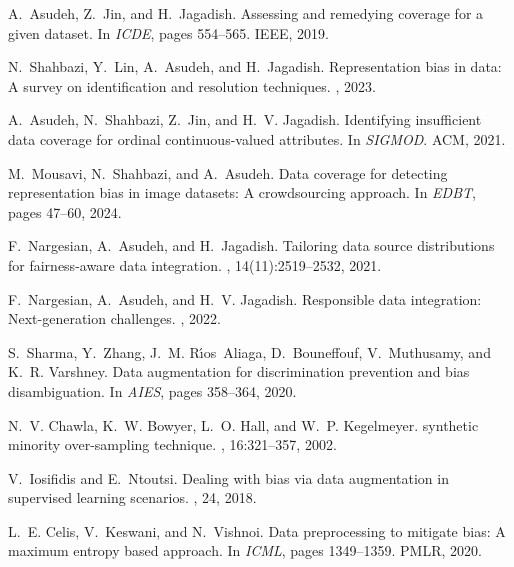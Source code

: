 \documentclass[11pt]{article}
\begin{document}

\small
% 
\begin{thebibliography}{10}

A.~Asudeh, Z.~Jin, and H.~Jagadish.
\newblock Assessing and remedying coverage for a given dataset.
\newblock In {\em ICDE}, pages 554--565. IEEE, 2019.

N.~Shahbazi, Y.~Lin, A.~Asudeh, and H.~Jagadish.
\newblock Representation bias in data: A survey on identification and resolution techniques.
, 2023.

A.~Asudeh, N.~Shahbazi, Z.~Jin, and H.~V. Jagadish.
\newblock Identifying insufficient data coverage for ordinal continuous-valued attributes.
\newblock In {\em SIGMOD}. ACM, 2021.

M.~Mousavi, N.~Shahbazi, and A.~Asudeh.
\newblock Data coverage for detecting representation bias in image datasets: {A} crowdsourcing approach.
\newblock In {\em {EDBT}}, pages 47--60, 2024.

F.~Nargesian, A.~Asudeh, and H.~Jagadish.
\newblock Tailoring data source distributions for fairness-aware data integration.
, 14(11):2519--2532, 2021.

F.~Nargesian, A.~Asudeh, and H.~V. Jagadish.
\newblock Responsible data integration: Next-generation challenges.
, 2022.

S.~Sharma, Y.~Zhang, J.~M. R{\'\i}os~Aliaga, D.~Bouneffouf, V.~Muthusamy, and K.~R. Varshney.
\newblock Data augmentation for discrimination prevention and bias disambiguation.
\newblock In {\em AIES}, pages 358--364, 2020.

N.~V. Chawla, K.~W. Bowyer, L.~O. Hall, and W.~P. Kegelmeyer.
 synthetic minority over-sampling technique.
, 16:321--357, 2002.

V.~Iosifidis and E.~Ntoutsi.
\newblock Dealing with bias via data augmentation in supervised learning scenarios.
, 24, 2018.

L.~E. Celis, V.~Keswani, and N.~Vishnoi.
\newblock Data preprocessing to mitigate bias: A maximum entropy based approach.
\newblock In {\em ICML}, pages 1349--1359. PMLR, 2020.


\end{thebibliography}
\end{document}
